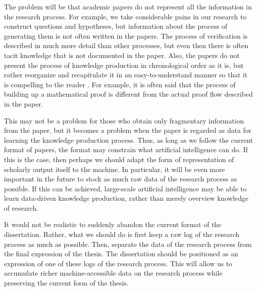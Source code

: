 The problem will be that academic papers do not represent all the information in the research process. For example, we take considerable pains in our research to construct questions and hypotheses, but information about the process of generating them is not often written in the papers. The process of verification is described in much more detail than other processes, but even then there is often tacit knowledge that is not documented in the paper. Also, the papers do not present the process of knowledge production in chronological order as it is, but rather reorganize and recapitulate it in an easy-to-understand manner so that it is compelling to the reader \cite{schickore2008doing}. For example, it is often said that the process of building up a mathematical proof is different from the actual proof flow described in the paper. 

This may not be a problem for those who obtain only fragmentary information from the paper, but it becomes a problem when the paper is regarded as data for learning the knowledge production process. Thus, as long as we follow the current format of papers, the format may constrain what artificial intelligence can do. If this is the case, then perhaps we should adapt the form of representation of scholarly output itself to the machine. In particular, it will be even more important in the future to stock as much raw data of the research process as possible. If this can be achieved, large-scale artificial intelligence may be able to learn data-driven knowledge production, rather than merely overview knowledge of research.

It would not be realistic to suddenly abandon the current format of the dissertation. Rather, what we should do is first keep a raw log of the research process as much as possible. Then, separate the data of the research process from the final expression of the thesis. The dissertation should be positioned as an expression of one of these logs of the research process. This will allow us to accumulate richer machine-accessible data on the research process while preserving the current form of the thesis.


